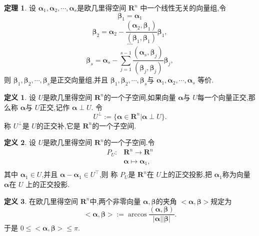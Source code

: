 \documentclass[a4paper,11pt]{article}%
\theoremstyle{remark}
\theoremstyle{definition}
\newtheorem{theorem}{定理}[section]
\theoremstyle{definition}
\newtheorem*{definition}{定义}
\theoremstyle{plain}
\newcommand*{\abs}[1]{\lvert #1 \rvert}
\begin{document}
\begin{theorem}
    设 $\bm{\alpha}_1,\bm{\alpha}_2,\cdots,\bm{\alpha}_s$是欧几里得空间 $\mathbf{R}^n$
    中一个线性无关的向量组,令
    \[\bm{\beta}_1=\bm{\alpha}_1\]
    \[\bm{\beta}_2=\bm{\alpha}_2-\frac{(\bm{\alpha}_2,\bm{\beta}_1)}{(\bm{\beta}_1,\bm{\beta}_1)}\bm{\beta}_1,\]
    \[\cdots\]\[\bm{\beta}_s=\bm{\alpha}_s-\sum_{j=1}^{s-1}{\frac{(\bm{\alpha}_s,\bm{\beta}_j)}{(\bm{\beta}_j,\bm{\beta}_j)}\bm{\beta}_j,}\]
    则 $\bm{\beta}_1,\bm{\beta}_2,\cdots,\bm{\beta}_s$是正交向量组,并且 $\bm{\beta}_1,\bm{\beta}_2,\cdots,\bm{\beta}_s$与 $\bm{\alpha}_1,\bm{\alpha}_2,\cdots,\bm{\alpha}_s$
    等价.
\end{theorem}
\begin{definition}
    设 $U$是欧几里得空间 $\mathbf{R}^n$的一个子空间,如果向量 $\bm{\alpha}$与
    $U$每一个向量正交,那么称 $\bm{\alpha}$与 $U$正交,记作 $\bm{\alpha}\perp U$.
    令 
    \[U^{\perp}:=\{\bm{\alpha}\in \mathbf{R}^n\vert \bm{\alpha}\perp U \}.\]
    称 $U^{\perp}$是 $U$的正交补,它是 $\mathbf{R}^n$的一个子空间.
\end{definition}
\begin{definition}
    设 $U$是欧几里得空间 $\mathbf{R}^n$的一个子空间.令\[
    \begin{array}{rl}
        P_U:&\mathbf{R}^n\longrightarrow \mathbf{R}^n\\
        &\bm{\alpha}\longmapsto \bm{\alpha}_1,\\
    \end{array}
    \]
    其中 $\bm{\alpha}_1\in U$,并且 $\bm{\alpha}-\bm{\alpha}_1\in U^{\top}$,则
    称 $P_U$是 $\mathbf{R}^n$在 $U$上的正交投影,把 $\bm{\alpha}_1$称为向量 $\bm{\alpha}$在 $U$
    上的正交投影.
\end{definition}
\begin{definition}
    在欧几里得空间 $\mathbf{R}^n$中,两个非零向量 $\bm{\alpha},\bm{\beta}$的夹角
    $<\bm{\alpha},\bm{\beta}>$规定为
    \[<\bm{\alpha},\bm{\beta}>:=\arccos{\frac{(\bm{\alpha},\bm{\beta})}{\abs{\bm{\alpha}}\abs{\bm{\beta}}}}.\]
    于是 $0\leq <\bm{\alpha},\bm{\beta}>\leq \pi.$
\end{definition}
\end{document}
